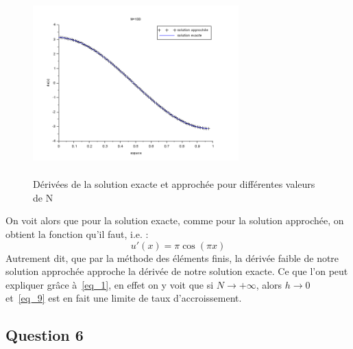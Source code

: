 \documentclass[a4paper,12pt]{article}
\begin{document}
\begin{figure}[h!]
\begin{center}
  \includegraphics[width=225pt,height=200pt]{image/figure_15}
\end{center}
\caption{D\'eriv\'ees de la solution exacte et approch\'ee pour diff\'erentes valeurs de N}
\label{D\'eriv\'ees de la solution exacte et approch\'ee pour diff\'erentes valeurs de N}
\end{figure}

On voit alors que pour la solution exacte, comme pour la solution approch\'ee, on obtient la fonction qu'il faut, i.e. :\\
\[u'(x)=\pi\cos(\pi x)\]
Autrement dit, que par la m\'ethode des \'el\'ements finis, la d\'eriv\'ee faible de notre solution approch\'ee approche la d\'eriv\'ee de notre solution exacte. Ce que l'on peut expliquer gr\^ace \`a~\eqref{eq_1}, en effet on y voit que si $N \to +\infty$, alors $h \to 0$ et~\eqref{eq_9} est en fait une limite de taux d'accroissement.

\subsection{Question 6}
\end{document}
